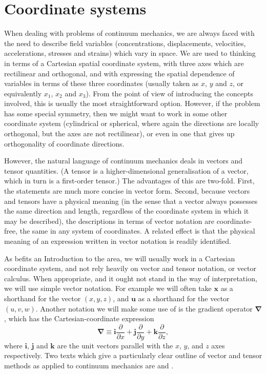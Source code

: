 \documentclass[a4paper,11pt]		{report}
\begin{document}
\section{Coordinate systems}

When dealing with problems of continuum mechanics, we are always faced
with the need to describe field variables (concentrations,
displacements, velocities, accelerations, stresses and strains) which
vary in space. We are used to thinking in terms of a Cartesian spatial
coordinate system, with three axes which are rectilinear and
orthogonal, and with expressing the spatial dependence of variables in
terms of these three coordinates (usually taken as $x$, $y$ and $z$,
or equivalently $x_1$, $x_2$ and $x_3$). From the point of view of
introducing the concepts involved, this is usually the most
straightforward option. However, if the problem has some special
symmetry, then we might want to work in some other coordinate system
(\eg cylindrical or spherical, where again the directions are locally
orthogonal, but the axes are not rectilinear), or even in one that
gives up orthogonality of coordinate directions.

However, the natural language of continuum mechanics deals in vectors
and tensor quantities. (A tensor is a higher-dimensional generalisation
of a vector, which in turn is a first-order tensor.) The advantages of
this are two-fold. First, the statements are much more concise in
vector form. Second, because vectors and tensors have a physical
meaning (in the sense that a vector always possesses the same
direction and length, regardless of the coordinate system in which it
may be described), the descriptions in terms of vector notation are
coordinate-free, \ie the same in any system of coordinates. A related
effect is that the physical meaning of an expression written in vector
notation is readily identified.

As befits an Introduction to the area, we will usually work in a
Cartesian coordinate system, and not rely heavily on vector and tensor
notation, or vector calculus. When appropriate, and it ought not stand
in the way of interpretation, we will use simple vector notation. For
example we will often take $\bm{x}$ as a shorthand for the vector $(x,
y, z)$, and $\bm{u}$ as a shorthand for the vector $(u, v,
w)$. Another notation we will make some use of is the gradient
operator $\bm{\nabla}$, which has the Cartesian-coordinate expression
\[
\bm{\nabla}\equiv\bm{i}\frac{\partial}{\partial x}+
\bm{j}\frac{\partial}{\partial y}+\bm{k}\frac{\partial}{\partial z},
\]
where $\bm{i}$, $\bm{j}$ and $\bm{k}$ are the unit vectors parallel
with the $x$, $y$, and $z$ axes respectively.  Two texts which give a
particularly clear outline of vector and tensor methods as applied to
continuum mechanics are \citet{aris62} and \citet{dan92}.
\end{document}
